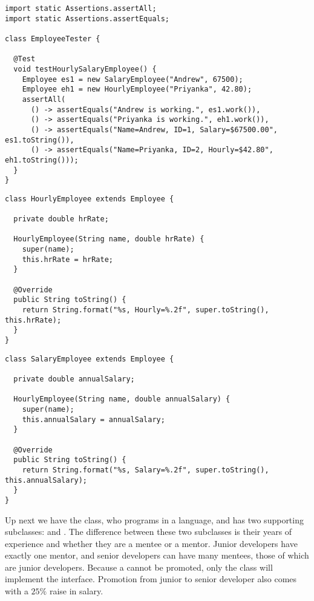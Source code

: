 \begin{lstlisting}[language=MyJava]
import static Assertions.assertAll;
import static Assertions.assertEquals;

class EmployeeTester {

  @Test
  void testHourlySalaryEmployee() {
    Employee es1 = new SalaryEmployee("Andrew", 67500);
    Employee eh1 = new HourlyEmployee("Priyanka", 42.80);
    assertAll(
      () -> assertEquals("Andrew is working.", es1.work()),
      () -> assertEquals("Priyanka is working.", eh1.work()),
      () -> assertEquals("Name=Andrew, ID=1, Salary=$67500.00", es1.toString()),
      () -> assertEquals("Name=Priyanka, ID=2, Hourly=$42.80", eh1.toString()));
  }
}
\end{lstlisting}

\begin{lstlisting}[language=MyJava]
class HourlyEmployee extends Employee {

  private double hrRate;

  HourlyEmployee(String name, double hrRate) {
    super(name);
    this.hrRate = hrRate;
  }

  @Override
  public String toString() {
    return String.format("%s, Hourly=%.2f", super.toString(), this.hrRate);
  }
}
\end{lstlisting}

\begin{lstlisting}[language=MyJava]
class SalaryEmployee extends Employee {

  private double annualSalary;

  HourlyEmployee(String name, double annualSalary) {
    super(name);
    this.annualSalary = annualSalary;
  }

  @Override
  public String toString() {
    return String.format("%s, Salary=%.2f", super.toString(), this.annualSalary);
  }
}
\end{lstlisting}

Up next we have the  class, who programs in a language, and has two supporting subclasses:  and . 
The difference between these two subclasses is their years of experience and whether they are a mentee or a mentor. 
Junior developers have exactly one mentor, and senior developers can have many mentees, those of which are junior developers. 
Because a  cannot be promoted, only the  class will implement the  interface. 
Promotion from junior to senior developer also comes with a $25\%$ raise in salary.

